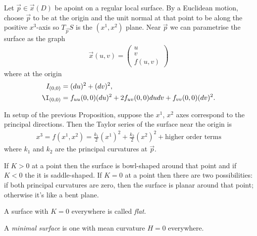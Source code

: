 \documentclass{article}
\begin{document}
\begin{proposition}
    Let $\vec p \in \vec x(D)$ be apoint on a regular local surface. By a Euclidean motion,
    choose $\vec p$ to be at the origin and the unit normal at that point to be along the positive
    $x^3$-axis so $T_{\vec p}S$ is the $(x^1,x^2)$ plane. Near $\vec p$ we can parametrise 
    the surface as the graph 
    \begin{align*}
        \vec x(u,v)=\begin{pmatrix}
            u \\ v \\ f(u,v)
        \end{pmatrix}
    \end{align*}
    where at the origin
    \begin{align*}
        I_{(0,0)}&=(du)^2+(dv)^2,\\
        \I_{(0,0)}&=f_{uu}(0,0)(du)^2+2f_{uv}(0,0)dudv+f_{vv}(0,0)(dv)^2.
    \end{align*}
\end{proposition}

\begin{proposition}
    In setup of the previous Proposition, suppose the $x^1$, $x^2$ axes correspond 
    to the principal directions. Then the Taylor series of the surface near the origin
    is 
    \begin{align*}
        x^3 = f(x^1, x^2) = \frac{k_1}{2}(x^1)^2 + \frac{k_2}{2}(x^2)^2 + \text{higher order terms}
    \end{align*}
    where $k_1$ and $k_2$ are the principal curvatures at $\vec p$.
\end{proposition}

\begin{corollary}
    If $K>0$ at a point then the surface is bowl-shaped around that point and if $K<0$ the it is
    saddle-shaped. If $K=0$ at a point then there are two possibilities: if both principal
    curvatures are zero, then the surface is planar around that point; otherwise it's like 
    a bent plane.
\end{corollary}

\begin{definition}
    A surface with $K=0$ everywhere is called \emph{flat}.
\end{definition}

\begin{definition}
    A \emph{minimal surface} is one with mean curvature $H=0$ everywhere.
\end{definition}
\end{document}
